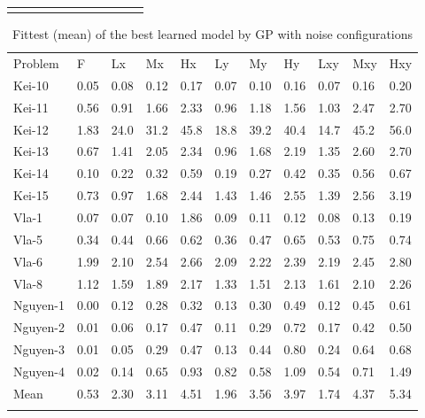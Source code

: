 \begin{center}
\begin{table}
\begin{tabular}{lllllllllll}
\noalign{\smallskip}\hline
\end{tabular}
\end{table}
\begin{table}
\caption{Fittest (mean) of the best learned model by GP with noise configurations}
\label{tab:Fittest}       %
\begin{tabular}{lllllllllll}
\hline\noalign{\smallskip}
Problem & F & Lx & Mx & Hx & Ly & My & Hy & Lxy & Mxy & Hxy  \\
\noalign{\smallskip}\hline\noalign{\smallskip}
Kei-10 & 0.05 & 0.08 & 0.12 & 0.17 & 0.07 & 0.10 & 0.16 & 0.07 & 0.16 & 0.20 \\
Kei-11 & 0.56 & 0.91 & 1.66 & 2.33 & 0.96 & 1.18 & 1.56 & 1.03 & 2.47 & 2.70 \\
Kei-12 & 1.83 & 24.0 & 31.2 & 45.8 & 18.8 & 39.2 & 40.4 & 14.7 & 45.2 & 56.0 \\
Kei-13 & 0.67 & 1.41 & 2.05 & 2.34 & 0.96 & 1.68 & 2.19 & 1.35 & 2.60 & 2.70 \\
Kei-14 & 0.10 & 0.22 & 0.32 & 0.59 & 0.19 & 0.27 & 0.42 & 0.35 & 0.56 & 0.67 \\
Kei-15 & 0.73 & 0.97 & 1.68 & 2.44 & 1.43 & 1.46 & 2.55 & 1.39 & 2.56 & 3.19 \\
Vla-1 & 0.07 & 0.07 & 0.10 & 1.86 & 0.09 & 0.11 & 0.12 & 0.08 & 0.13 & 0.19 \\
Vla-5 & 0.34 & 0.44 & 0.66 & 0.62 & 0.36 & 0.47 & 0.65 & 0.53 & 0.75 & 0.74 \\
Vla-6 & 1.99 & 2.10 & 2.54 & 2.66 & 2.09 & 2.22 & 2.39 & 2.19 & 2.45 & 2.80 \\
Vla-8 & 1.12 & 1.59 & 1.89 & 2.17 & 1.33 & 1.51 & 2.13 & 1.61 & 2.10 & 2.26 \\
Nguyen-1 & 0.00 & 0.12 & 0.28 & 0.32 & 0.13 & 0.30 & 0.49 & 0.12 & 0.45 & 0.61 \\
Nguyen-2 & 0.01 & 0.06 & 0.17 & 0.47 & 0.11 & 0.29 & 0.72 & 0.17 & 0.42 & 0.50 \\
Nguyen-3 & 0.01 & 0.05 & 0.29 & 0.47 & 0.13 & 0.44 & 0.80 & 0.24 & 0.64 & 0.68 \\
Nguyen-4 & 0.02 & 0.14 & 0.65 & 0.93 & 0.82 & 0.58 & 1.09 & 0.54 & 0.71 & 1.49 \\
Mean & 0.53 & 2.30 & 3.11 & 4.51 & 1.96 & 3.56 & 3.97 & 1.74 & 4.37 & 5.34 \\

\noalign{\smallskip}\hline
\end{tabular}
\end{table}


\end{center}
